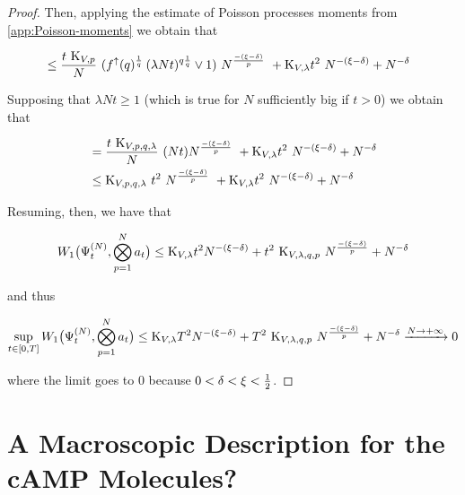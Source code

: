 \begin{proof}
	Then, applying the estimate of Poisson processes moments from \ref{app:Poisson-moments} we obtain that
	
	\begin{align*}
		&\leq
			\frac{t\
				\text{K}_{V,p}
			}{N}\
				(f^\uparrow(q)^\frac{1}{q}\: (\lambda Nt)^{q\frac{1}{q}} \vee 1)\
			N^\frac{-(\xi-\delta)}{p}\
			+
			\text{K}_{V, \lambda} 
			t^2\
			N^{-(\xi-\delta)}
			+
			N^{-\delta}
	\end{align*}
	
	Supposing that $\lambda Nt \geq 1$ (which is true for $N$ sufficiently big if $t>0$) we obtain that
	
	\begin{align*}
		&=
				\frac{t\
					\text{K}_{V,p,q, \lambda}
				}{N}\
				(Nt)
				N^\frac{-(\xi-\delta)}{p}\
			+
				\text{K}_{V, \lambda} 
				t^2\
				N^{-(\xi-\delta)}
			+
				N^{-\delta}
		\\
			&\leq
				\text{K}_{V,p,q, \lambda}\
				t^2\
				N^\frac{-(\xi-\delta)}{p}\
				+
				\text{K}_{V, \lambda} 
				t^2\
				N^{-(\xi-\delta)}
				+
				N^{-\delta}
	\end{align*}
	
	Resuming, then, we have that
	
	\begin{equation*}
		W_1 \big(
		\Psi_t^{(N)}, \bigotimes_{p=1}^{N}a_t
		\big) 
		\leq
		\text{K}_{V, \lambda}
		t^2
		N^{-(\xi-\delta)}
		+
		t^2\
		\text{K}_{V,\lambda,q,p}\
		N^\frac{-(\xi-\delta)}{p}
		+
		N^{-\delta}
	\end{equation*}
	
	and thus 
	
	\begin{equation*}
		\sup_{t\in[0,T]} W_1 \big(
		\Psi_t^{(N)}, \bigotimes_{p=1}^{N}a_t
		\big) 
		\leq
		\text{K}_{V, \lambda}
		T^2
		N^{-(\xi-\delta)}
		+
		T^2\
		\text{K}_{V,\lambda,q,p}\
		N^\frac{-(\xi-\delta)}{p}
		+
		N^{-\delta}
		\xrightarrow{N\rightarrow +\infty} 0
	\end{equation*}
	
	where the limit goes to $0$ because $0< \delta < \xi < \frac{1}{2}$.
\end{proof}


\section{A Macroscopic Description for the cAMP Molecules?}\label{ch3:macro-cAMP?}

